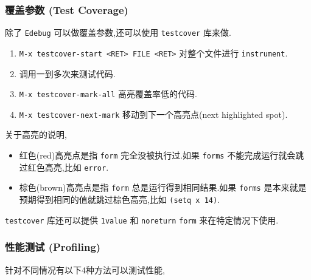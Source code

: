 \documentclass[11pt]{article}
\begin{document}
\subsubsection{覆盖参数 (Test Coverage)}
\label{sec:org0e0e9d2}

除了 \texttt{Edebug} 可以做覆盖参数,还可以使用 \texttt{testcover} 库来做.

\begin{enumerate}
\item \texttt{M-x testcover-start <RET> FILE <RET>} 对整个文件进行 \texttt{instrument}.

\item 调用一到多次来测试代码.

\item \texttt{M-x testcover-mark-all} 高亮覆盖率低的代码.

\item \texttt{M-x testcover-next-mark} 移动到下一个高亮点(next highlighted spot).
\end{enumerate}

关于高亮的说明,

\begin{itemize}
\item 红色(red)高亮点是指 \texttt{form} 完全没被执行过.如果 \texttt{forms} 不能完成运行就会跳过红色高亮,比如 \texttt{error}.

\item 棕色(brown)高亮点是指 \texttt{form} 总是运行得到相同结果.如果 \texttt{forms} 是本来就是预期得到相同的值就跳过棕色高亮,比如 \texttt{(setq x 14)}.
\end{itemize}

\texttt{testcover} 库还可以提供 \texttt{1value} 和 \texttt{noreturn} \texttt{form} 来在特定情况下使用.


\subsubsection{性能测试 (Profiling)}
\label{sec:org5fa8c4b}

针对不同情况有以下4种方法可以测试性能,
\end{document}
